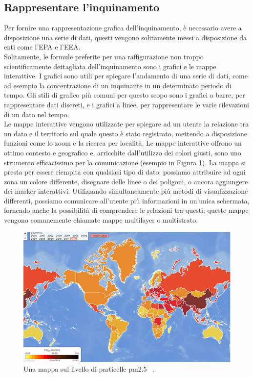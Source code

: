\subsection{Rappresentare l'inquinamento}
Per fornire una rappresentazione grafica dell’inquinamento, è necessario avere a disposizione una serie di dati, questi vengono solitamente messi a disposizione da enti come l'EPA e l'EEA.
\\ 
Solitamente, le formule preferite per una raffigurazione non troppo scientificamente dettagliata dell’inquinamento sono i grafici e le mappe interattive.
I grafici sono utili per spiegare l'andamento di una serie di dati, come ad esempio la concentrazione di un inquinante in un determinato periodo di tempo.
Gli stili di grafico più comuni per questo scopo sono i grafici a barre, per rappresentare dati discreti, e i grafici a linee, per rappresentare le varie rilevazioni di un dato nel tempo.
\\ 
Le mappe interattive vengono utilizzate per spiegare ad un utente la relazione tra un dato e il territorio sul quale questo è stato registrato, mettendo a disposizione funzioni come lo zoom e la ricerca per località.
Le mappe interattive offrono un ottimo contesto e geografico e, arricchite dall'utilizzo dei colori giusti, sono uno strumento efficacissimo per la comunicazione (esempio in Figura \ref{fig:pollution_map}).
La mappa si presta per essere riempita con qualsiasi tipo di dato: possiamo attribuire ad ogni zona un colore differente, disegnare delle linee o dei poligoni, o ancora aggiungere dei marker interattivi.
Utilizzando simultaneamente più metodi di visualizzazione differenti, possiamo comunicare all'utente più informazioni in un'unica schermata, fornendo anche la possibilità di comprendere le relazioni tra questi; queste mappe vengono comunemente chiamate mappe multilayer o multistrato.
\begin{figure}[H]
  \includegraphics[width=\linewidth]{img/mappapm.png}
  \caption{Una mappa sul livello di particelle pm2.5 ~\cite{aqimap}.}
  \label{fig:pollution_map}
\end{figure}


